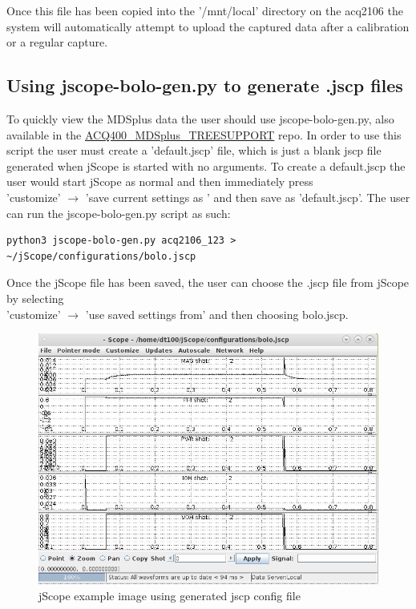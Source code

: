 \documentclass{article}
\begin{document}
Once this file has been copied into the '/mnt/local' directory on the acq2106 the system will automatically attempt to upload the
captured data after a calibration or a regular capture.

\subsection{Using jscope-bolo-gen.py to generate .jscp files}
To quickly view the MDSplus data the user should use jscope-bolo-gen.py, also available in the
\href{https://github.com/D-TACQ/ACQ400_MDSplus_TREESUPPORT}{ACQ400\_MDSplus\_TREESUPPORT} repo.
In order to use this script the user must create a 'default.jscp' file, which is just a blank jscp file generated
when jScope is started with no arguments. To create a default.jscp the user would start jScope as normal and then 
immediately press \\
'customize' $\rightarrow$ 'save current settings as ' and then save as 'default.jscp'. The user can run the jscope-bolo-gen.py
script as such:

\begin{lstlisting}[breaklines]
python3 jscope-bolo-gen.py acq2106_123 > ~/jScope/configurations/bolo.jscp
\end{lstlisting}

Once the jScope file has been saved, the user can choose the .jscp file from jScope by selecting \\
'customize' $\rightarrow$ 'use saved settings from' and then choosing bolo.jscp.

\begin{figure} [hbt!]
	\centering
	\includegraphics[width=5.0in]{images/jscope.png}
	\caption{jScope example image using generated jscp config file}
	\label{jscope}
\end{figure}
\end{document}
